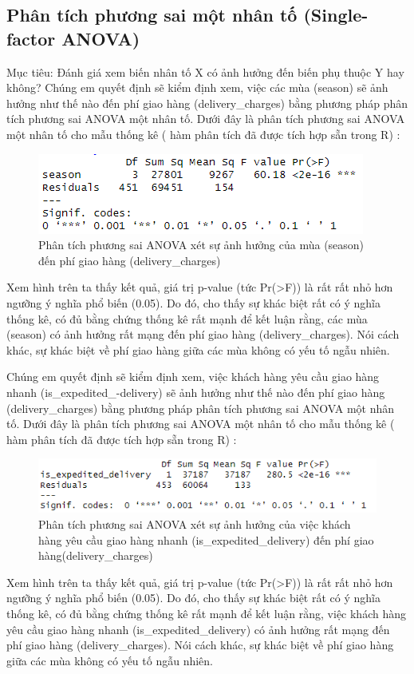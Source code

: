 \subsection{Phân tích phương sai một nhân tố (Single-factor ANOVA)}
Mục tiêu: Đánh giá xem biến nhân tố X có ảnh hưởng đến biến phụ thuộc Y hay không?
    Chúng em quyết định sẽ kiểm định xem, việc các mùa (season) sẽ ảnh hưởng như thế nào đến phí giao hàng (delivery\_charges) bằng
phương pháp phân tích phương sai ANOVA một nhân tố. Dưới đây là phân tích phương sai ANOVA một nhân tố cho mẫu thống kê ( hàm phân tích đã được tích hợp sẵn trong R) :

\begin{figure}[!htbp]
    \centering
    \includegraphics[width=0.7\linewidth]{graphics/5.3.1.png}
    \caption{Phân tích phương sai ANOVA xét sự ảnh hưởng của mùa (season) đến phí giao hàng (delivery\_charges)}
\end{figure}

    Xem hình trên ta thấy kết quả, giá trị p-value (tức Pr(>F)) là rất rất nhỏ hơn ngưỡng ý nghĩa phổ biến (0.05). Do đó, cho thấy sự
khác biệt rất có ý nghĩa thống kê, có đủ bằng chứng thống kê rất mạnh để kết luận rằng, các mùa (season) có ảnh hưởng rất mạng đến phí giao hàng (delivery\_charges). Nói cách khác, sự khác biệt về phí giao hàng giữa các mùa không có yếu tố ngẫu nhiên.


    Chúng em quyết định sẽ kiểm định xem, việc khách hàng yêu cầu giao hàng nhanh (is\_expedited\_-delivery) sẽ ảnh hưởng như thế nào đến
phí giao hàng (delivery\_charges) bằng phương pháp phân tích phương sai ANOVA một nhân tố. Dưới đây là phân tích phương sai ANOVA một nhân tố cho mẫu thống kê ( hàm phân tích đã được tích hợp sẵn trong R) :
\begin{figure}[!htbp]
    \centering
    \includegraphics[width=0.7\linewidth]{graphics/5.3.2.png}
    \caption{Phân tích phương sai ANOVA xét sự ảnh hưởng của việc khách hàng yêu cầu giao hàng nhanh (is\_expedited\_delivery) đến phí giao hàng(delivery\_charges)}
\end{figure}

    Xem hình trên ta thấy kết quả, giá trị p-value (tức Pr(>F)) là rất rất nhỏ hơn ngưỡng ý nghĩa phổ biến (0.05). Do đó, cho thấy sự
khác biệt rất có ý nghĩa thống kê, có đủ bằng chứng thống kê rất mạnh để kết luận rằng, việc khách hàng yêu cầu giao hàng nhanh (is\_expedited\_delivery) có ảnh hưởng rất mạng đến phí giao hàng (delivery\_charges). Nói cách khác, sự khác biệt về phí giao hàng giữa các mùa không có yếu tố ngẫu nhiên.


